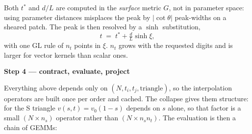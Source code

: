 \documentclass[11pt]{article}
\newcommand{\stepbox}[1]{%
  \par\medskip\noindent\textbf{\color{cElem}#1}\par\nopagebreak\smallskip}
\begin{document}
Both $t^\ast$ and $d/L$ are computed in the \emph{surface} metric $G$, not in parameter space:
using parameter distances misplaces the peak by $|\cot\theta|$ peak-widths on a sheared patch.
The peak is then resolved by a $\sinh$ substitution,
\[
  t \;=\; t^\ast + \tfrac{d}{L}\sinh\xi ,
\]
with one GL rule of $n_t$ points in $\xi$. $n_t$ grows with the requested digits and is larger
for vector kernels than scalar ones.

\begin{center}
\begin{minipage}{\textwidth}\centering
{}
\end{minipage}
\end{center}

\stepbox{Step 4 --- contract, evaluate, project}

Everything above depends only on $(N,t_i,t_j,\text{triangle})$, so the interpolation operators are
built once per order and cached. The collapse gives them structure: for the S triangle
$v(s,t)=v_0(1-s)$ depends on $s$ alone, so that factor is a small $(N\times n_s)$ operator rather
than $(N \times n_s n_t)$. The evaluation is then a chain of GEMMs:
\end{document}
